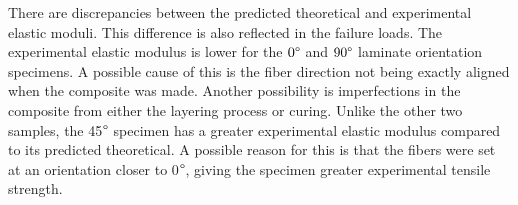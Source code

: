 There are discrepancies between the predicted theoretical and experimental elastic moduli. This difference is also reflected in the failure loads. The experimental elastic modulus is lower for the $0\degree$ and $90\degree$ laminate orientation specimens. A possible cause of this is the fiber direction not being exactly aligned when the composite was made. Another possibility is imperfections in the composite from either the layering process or curing. Unlike the other two samples, the 45$\degree$ specimen has a greater experimental elastic modulus compared to its predicted theoretical. A possible reason for this is that the fibers were set at an orientation closer to 0$\degree$, giving the specimen greater experimental tensile strength.  